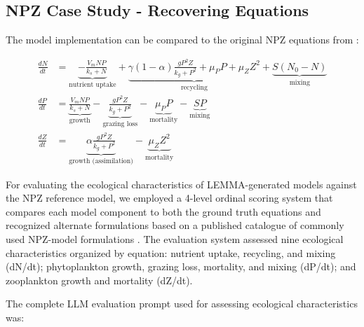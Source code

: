\setcounter{section}{0}
\renewcommand{\thesection}{S\arabic{section}}



\subsection{NPZ Case Study - Recovering Equations}
\label{subsec:npz_evaluation_prompt}

The model implementation can be compared to the original NPZ equations from \cite{edwards1999zooplankton}:

\begin{align*}
    \frac{dN}{dt} &= \underbrace{-\frac{V_m N P}{k_s + N}}_{\text{nutrient uptake}}
                   + \underbrace{\gamma(1-\alpha)\frac{g P^2 Z}{k_g + P^2} + \mu_P P + \mu_Z Z^2}_{\text{recycling}}
                   + \underbrace{S(N_0 - N)}_{\text{mixing}} \\[6pt]
    \frac{dP}{dt} &= \underbrace{\frac{V_m N P}{k_s + N}}_{\text{growth}}
                   - \underbrace{\frac{g P^2 Z}{k_g + P^2}}_{\text{grazing loss}}
                   - \underbrace{\mu_P P}_{\text{mortality}}
                   - \underbrace{S P}_{\text{mixing}} \\[6pt]
    \frac{dZ}{dt} &= \underbrace{\alpha\frac{g P^2 Z}{k_g + P^2}}_{\text{growth (assimilation)}}
                   - \underbrace{\mu_Z Z^2}_{\text{mortality}}
    \end{align*}


For evaluating the ecological characteristics of LEMMA-generated models against the NPZ reference model, we employed a 4-level ordinal scoring system that compares each model component to both the ground truth equations and recognized alternate formulations based on a published catalogue of commonly used NPZ-model formulations \citep{franks2002npz}. The evaluation system assessed nine ecological characteristics organized by equation: nutrient uptake, recycling, and mixing (dN/dt); phytoplankton growth, grazing loss, mortality, and mixing (dP/dt); and zooplankton growth and mortality (dZ/dt).


The complete LLM evaluation prompt used for assessing ecological characteristics was:

